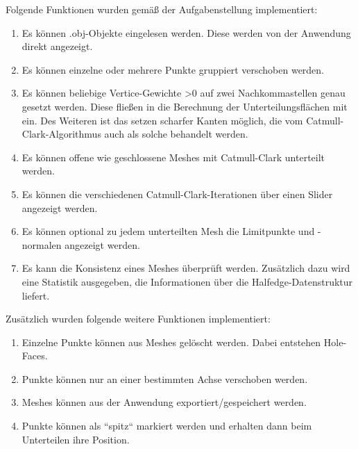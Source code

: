 Folgende Funktionen wurden gemäß der Aufgabenstellung implementiert:
\begin{enumerate}
\item Es können .obj-Objekte eingelesen werden. Diese werden von der Anwendung direkt angezeigt.
\item Es können einzelne oder mehrere Punkte gruppiert verschoben werden. 
\item Es können beliebige Vertice-Gewichte >0 auf zwei Nachkommastellen genau gesetzt werden. Diese fließen in die Berechnung der Unterteilungsflächen mit ein. 
Des Weiteren ist das setzen scharfer Kanten möglich, die vom Catmull-Clark-Algorithmus auch als solche behandelt werden.
\item Es können offene wie geschlossene Meshes mit Catmull-Clark unterteilt werden. 
\item Es können die verschiedenen Catmull-Clark-Iterationen über einen Slider angezeigt werden. 
\item Es können optional zu jedem unterteilten Mesh die Limitpunkte und -normalen angezeigt werden.
\item Es kann die Konsistenz eines Meshes überprüft werden. Zusätzlich dazu wird eine Statistik ausgegeben, die Informationen über die Halfedge-Datenstruktur liefert. 
\end{enumerate}

Zusätzlich wurden folgende weitere Funktionen implementiert:
\begin{enumerate}
\item Einzelne Punkte können aus Meshes gelöscht werden. Dabei entstehen Hole-Faces.
\item Punkte können nur an einer bestimmten Achse verschoben werden.
\item Meshes können aus der Anwendung exportiert/gespeichert werden.
\item Punkte können als ``spitz`` markiert werden und erhalten dann beim Unterteilen ihre Position.
\end{enumerate}